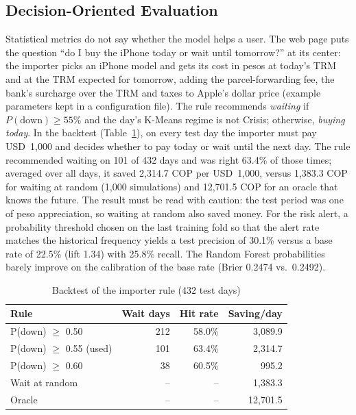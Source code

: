 \documentclass[conference]{IEEEtran}
\begin{document}
\subsection{Decision-Oriented Evaluation}
Statistical metrics do not say whether the model helps a user. The web page puts the question ``do I buy the iPhone today or wait until tomorrow?'' at its center: the importer picks an iPhone model and gets its cost in pesos at today's TRM and at the TRM expected for tomorrow, adding the parcel-forwarding fee, the bank's surcharge over the TRM and taxes to Apple's dollar price (example parameters kept in a configuration file). The rule recommends \emph{waiting} if $P(\text{down})\geq 55\%$ and the day's K-Means regime is not Crisis; otherwise, \emph{buying today}. In the backtest (Table~\ref{tab:regla}), on every test day the importer must pay USD~1{,}000 and decides whether to pay today or wait until the next day. The rule recommended waiting on 101 of 432 days and was right 63.4\% of those times; averaged over all days, it saved 2{,}314.7 COP per USD~1{,}000, versus 1{,}383.3 COP for waiting at random (1{,}000 simulations) and 12{,}701.5 COP for an oracle that knows the future. The result must be read with caution: the test period was one of peso appreciation, so waiting at random also saved money. For the risk alert, a probability threshold chosen on the last training fold so that the alert rate matches the historical frequency yields a test precision of 30.1\% versus a base rate of 22.5\% (lift 1.34) with 25.8\% recall. The Random Forest probabilities barely improve on the calibration of the base rate (Brier 0.2474 vs.\ 0.2492).

\begin{table}[t]
\caption{Backtest of the importer rule (432 test days)}
\label{tab:regla}
\centering
\footnotesize
\begin{tabular}{@{}lrrr@{}}
\toprule
Rule & Wait days & Hit rate & Saving/day \\
\midrule
P(down) $\geq$ 0.50 & 212 & 58.0\% & 3{,}089.9 \\
P(down) $\geq$ 0.55 (used) & 101 & 63.4\% & 2{,}314.7 \\
P(down) $\geq$ 0.60 & 38 & 60.5\% & 995.2 \\
Wait at random & -- & -- & 1{,}383.3 \\
Oracle & -- & -- & 12{,}701.5 \\
\bottomrule
\end{tabular}
\par{}
\end{table}
\end{document}
